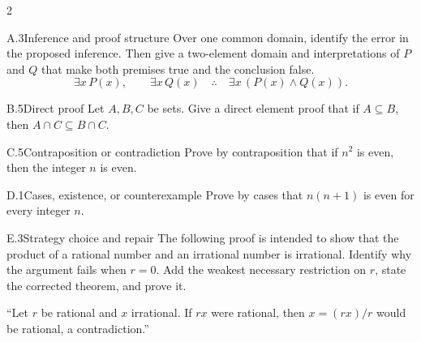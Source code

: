 \documentclass[9pt]{extarticle}
\begin{document}
\begin{multicols}{2}
\begin{CoreProblem}{A.3}{Inference and proof structure}
Over one common domain, identify the error in the proposed inference. Then give
a two-element domain and interpretations of $P$ and $Q$ that make both premises
true and the conclusion false.
\[
\exists x\,P(x),\qquad \exists x\,Q(x)
\quad\therefore\quad
\exists x\,(P(x)\land Q(x)).
\]
\end{CoreProblem}
\begin{CoreProblem}{B.5}{Direct proof}
Let $A,B,C$ be sets. Give a direct element proof that if $A\subseteq B$, then
$A\cap C\subseteq B\cap C$.
\end{CoreProblem}
\begin{CoreProblem}{C.5}{Contraposition or contradiction}
Prove by contraposition that if $n^2$ is even, then the integer $n$ is even.
\end{CoreProblem}
\columnbreak
\begin{CoreProblem}{D.1}{Cases, existence, or counterexample}
Prove by cases that $n(n+1)$ is even for every integer $n$.
\end{CoreProblem}
\begin{CoreProblem}{E.3}{Strategy choice and repair}
The following proof is intended to show that the product of a rational number
and an irrational number is irrational. Identify why the argument fails when
$r=0$. Add the weakest necessary restriction on $r$, state the corrected
theorem, and prove it.

``Let $r$ be rational and $x$ irrational. If $rx$ were rational, then $x=(rx)/r$ would be rational, a contradiction.''
\end{CoreProblem}
\end{multicols}
\CoreWorkArea
\FormBreak
{}
\end{document}
